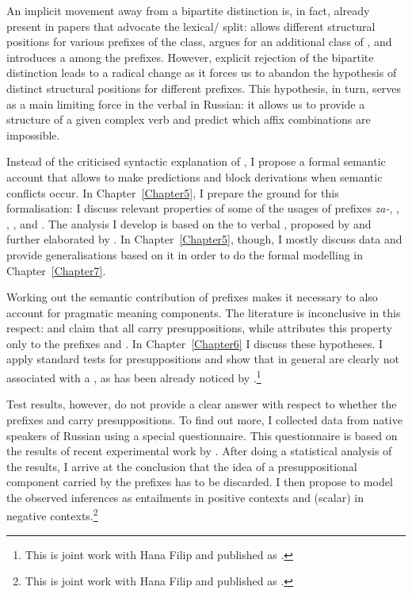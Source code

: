 An implicit movement away from a bipartite distinction is, in fact, already present in papers that advocate the lexical/ split: \citet{Svenonius:04b} allows different structural positions for various prefixes of the  class, \citet{Tatevosov:07} argues for an additional class of , and \citet{Tatevosov:09} introduces a  among the  prefixes. However, explicit rejection of the bipartite distinction leads to a radical change as it forces us to abandon the hypothesis of distinct structural positions for different prefixes. This hypothesis, in turn, serves as a main limiting force in the  verbal  in Russian: it allows us to provide a structure of a given complex verb and predict which affix combinations are impossible.

Instead of the criticised syntactic explanation of , I propose a formal semantic account that allows to make predictions and block derivations when semantic conflicts occur. In Chapter~\ref{Chapter5}, I prepare the ground for this formalisation: I discuss relevant properties of some of the usages of prefixes \textit{\mbox{za-}}, , , , and . The analysis I develop is based on the  to verbal , proposed by \citet{Filip:08} and further elaborated by \citet{Kagan:12, Kagan:book}. In Chapter~\ref{Chapter5}, though, I mostly discuss data and provide generalisations based on it in order to do the formal modelling in Chapter~\ref{Chapter7}.

Working out the semantic contribution of prefixes makes it necessary to also account for pragmatic meaning components. The literature is inconclusive in this respect: \citet{Paducheva:96} and \citet{Romanova:06} claim that all  carry presuppositions, while \citet{Kagan:book} attributes this property only to the prefixes  and . In Chapter~\ref{Chapter6} I discuss these hypotheses. I apply standard tests for presuppositions and show that  in general are clearly not associated with a , as has been already noticed by \citet{Gronn:04}.\footnote{This is joint work with Hana Filip and published as \citealt{ZinovaFilip:14}.}

Test results, however, do not provide a clear answer with respect to whether the prefixes  and  carry presuppositions. To find out more, I collected data from native speakers of Russian using a special questionnaire. This questionnaire is based on the results of recent experimental work by \citet{Chemla:09}. After doing a statistical analysis of the results, I arrive at the conclusion that the idea of a presuppositional component carried by the prefixes has to be discarded. I then propose to model the observed inferences as entailments in positive contexts and (scalar)  in negative contexts.\footnote{This is joint work with Hana Filip and published as \citealt{ZinovaFilip:SALT}.}

